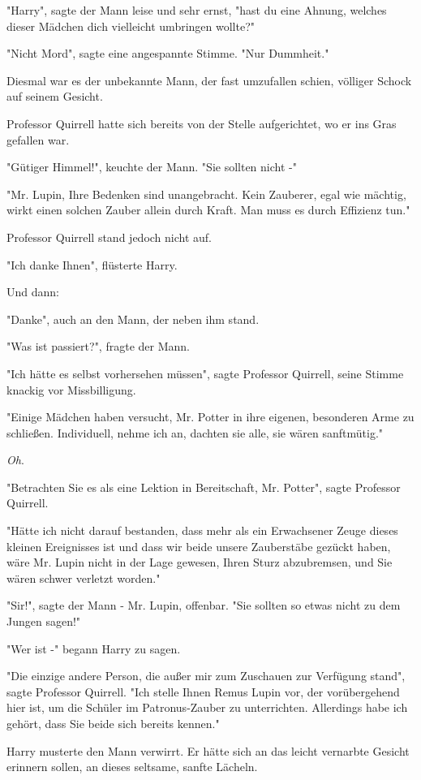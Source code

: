 {"Harry", sagte der Mann leise und sehr ernst, "hast du eine Ahnung, welches dieser Mädchen dich vielleicht umbringen wollte?"

"Nicht Mord", sagte eine angespannte Stimme. "Nur Dummheit."

Diesmal war es der unbekannte Mann, der fast umzufallen schien, völliger Schock auf seinem Gesicht.

Professor Quirrell hatte sich bereits von der Stelle aufgerichtet, wo er ins Gras gefallen war.

"Gütiger Himmel!", keuchte der Mann. "Sie sollten nicht -"

"Mr. Lupin, Ihre Bedenken sind unangebracht. Kein Zauberer, egal wie mächtig, wirkt einen solchen Zauber allein durch Kraft. Man muss es durch Effizienz tun."

Professor Quirrell stand jedoch nicht auf.

"Ich danke Ihnen", flüsterte Harry.

Und dann:

"Danke", auch an den Mann, der neben ihm stand.

"Was ist passiert?", fragte der Mann.

"Ich hätte es selbst vorhersehen müssen", sagte Professor Quirrell, seine Stimme knackig vor Missbilligung.

"Einige Mädchen haben versucht, Mr. Potter in ihre eigenen, besonderen Arme zu schließen. Individuell, nehme ich an, dachten sie alle, sie wären sanftmütig."

\emph{Oh}.

"Betrachten Sie es als eine Lektion in Bereitschaft, Mr. Potter", sagte Professor Quirrell.

"Hätte ich nicht darauf bestanden, dass mehr als ein Erwachsener Zeuge dieses kleinen Ereignisses ist und dass wir beide unsere Zauberstäbe gezückt haben, wäre Mr. Lupin nicht in der Lage gewesen, Ihren Sturz abzubremsen, und Sie wären schwer verletzt worden."

"Sir!", sagte der Mann - Mr. Lupin, offenbar. "Sie sollten so etwas nicht zu dem Jungen sagen!"

"Wer ist -" begann Harry zu sagen.

"Die einzige andere Person, die außer mir zum Zuschauen zur Verfügung stand", sagte Professor Quirrell. "Ich stelle Ihnen Remus Lupin vor, der vorübergehend hier ist, um die Schüler im Patronus-Zauber zu unterrichten. Allerdings habe ich gehört, dass Sie beide sich bereits kennen."

Harry musterte den Mann verwirrt. Er hätte sich an das leicht vernarbte Gesicht erinnern sollen, an dieses seltsame, sanfte Lächeln.

}
